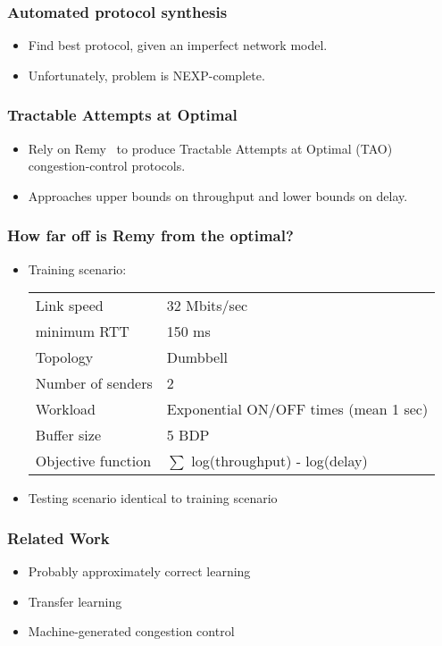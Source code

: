 \documentclass[svgnames]{beamer}
\begin{document}
\begin{Large}
\begin{frame}
\frametitle{Automated protocol synthesis}
\begin{itemize}
\item Find best protocol, given an imperfect network model.
\item Unfortunately, problem is NEXP-complete. 
\end{itemize}
\end{frame}

\begin{frame}
\frametitle{Tractable Attempts at Optimal}
\begin{itemize}
\item Rely on Remy~\cite{remy} to produce Tractable Attempts at Optimal (TAO) congestion-control protocols.
\item Approaches upper bounds on throughput and lower bounds on delay.
\end{itemize}
\end{frame}

\begin{frame}
\frametitle{How far off is Remy from the optimal?}
\begin{itemize}
\item Training scenario:
\begin{tabular}{ll}
Link speed & 32 Mbits/sec \\
minimum RTT & 150 ms \\
Topology & Dumbbell \\
Number of senders & 2 \\
Workload & Exponential ON/OFF times (mean 1 sec) \\
Buffer size & 5 BDP \\
Objective function & $\sum$ log(throughput) - log(delay)
\end{tabular}
\item Testing scenario identical to training scenario
\end{itemize}

\end{frame}











\begin{frame}
\frametitle{Related Work}
\begin{itemize}
\item Probably approximately correct learning
\item Transfer learning
\item Machine-generated congestion control
\end{itemize}
\end{frame}


\end{Large}
\end{document}
